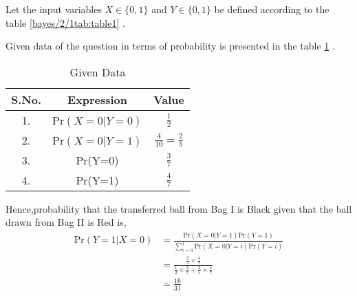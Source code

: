 Let the input variables $X \in \{0,1\}$ and $Y \in \{0,1\}$ be defined according to the table \ref{bayes/2/1tab:table1} .

\begin{table}[!ht]
\centering
{}
\caption{Input Variables}
\label{bayes/2/1tab:table1}
\end{table}
 Given data of the question in terms of probability is presented in the table \ref{bayes/2/1tab:table2} .

\begin{table}[!ht]
\centering
\begin{tabular}{|c|c|c|} 
\hline
S.No. & Expression & Value \\
\hline 
1. &  Pr$(X=0|Y=0)$ & $\frac{1}{2}$ \\ 
\hline 
2. & Pr$(X=0|Y=1)$ & $\frac{4}{10} = \frac{2}{5}$ \\ 
\hline 
3. & Pr(Y=0) & $\frac{3}{7}$\\ 
\hline 
4. & Pr(Y=1) & $\frac{4}{7}$ \\ 
\hline 
\end{tabular}
\caption{Given Data}
\label{bayes/2/1tab:table2}
\end{table}
Hence,probability that the transferred ball from Bag I is Black given that the ball drawn from Bag II is Red is,
\begin{align}
    \text{Pr}(Y=1|X=0) &= \frac{\text{Pr}(X=0|Y=1)\text{Pr}(Y=1)}{ \sum_{i=0}^{1}\text{Pr}(X=0|Y=i)\text{Pr}(Y=i)}
    \\
    &= \frac{\frac{2}{5} \times \frac{4}{7}}{\frac{1}{2} \times \frac{3}{7} + \frac{2}{5} \times \frac{4}{7}}
    \\
    &= \frac{16}{31}
\end{align}